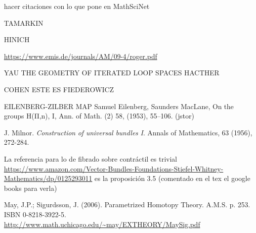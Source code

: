 \documentclass[TFM.tex]{subfiles}
\begin{document}
%


\begin{thebibliography}{}






 hacer citaciones con lo que pone en MathSciNet

 TAMARKIN

 HINICH

 \url{https://www.emis.de/journals/AM/09-4/roger.pdf}





 YAU
 THE GEOMETRY OF ITERATED LOOP SPACES
 HACTHER

 COHEN
 ESTE ES FIEDEROWICZ

 EILENBERG-ZILBER MAP Samuel Eilenberg, Saunders MacLane, On the groups H(Π,n), I, Ann. of Math. (2) 58, (1953), 55–106. (jstor)


 J. Milnor. \emph{Construction of universal bundles I}. Annals of Mathematics, 63 (1956), 272-284. 

 La referencia para lo de fibrado sobre contráctil es trivial \url{https://www.amazon.com/Vector-Bundles-Foundations-Stiefel-Whitney-Mathematics/dp/0125293011} es la proposición 3.5 (comentado en el tex el google books para verla) %

 May, J.P.; Sigurdsson, J. (2006). Parametrized Homotopy Theory. A.M.S. p. 253. ISBN 0-8218-3922-5. \url{http://www.math.uchicago.edu/~may/EXTHEORY/MaySig.pdf}
\end{thebibliography}
\end{document}
